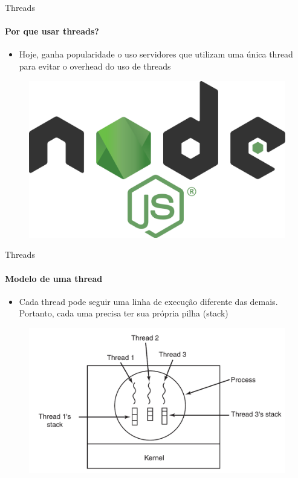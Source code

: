 \documentclass{beamer}
\begin{document}
\begin{frame}{Threads}
	\framesubtitle{Por que usar threads?}
	\begin{itemize}
		\item Hoje, ganha popularidade o uso servidores que utilizam uma única thread para evitar o overhead do uso de threads
	\end{itemize}
	\begin{figure}
		\includegraphics[width=0.4\paperwidth]{resources/node}
	\end{figure}
\end{frame}
\begin{frame}{Threads}
	\framesubtitle{Modelo de uma thread}
	\begin{itemize}
		\item Cada thread pode seguir uma linha de execução diferente das demais. Portanto, cada uma precisa ter sua própria pilha (stack)
	\end{itemize}
	\begin{figure}
		\includegraphics[width=0.7\paperwidth]{resources/stack}
	\end{figure}
\end{frame}
\end{document}
